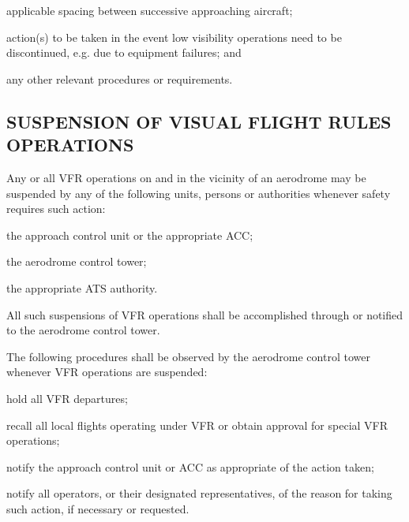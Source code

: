 \begin{enumerate}
\begin{enumalph}
        \item applicable spacing between successive approaching aircraft;
        \item action(s) to be taken in the event low visibility operations need to be discontinued, e.g. due to equipment failures; and
        \item any other relevant procedures or requirements.
    \end{enumalph}


\end{enumerate}

\subsection[Suspension of visual flight rules operations]{SUSPENSION OF VISUAL FLIGHT RULES OPERATIONS}

\begin{enumnoss}
    \item Any or all VFR operations on and in the vicinity of an aerodrome may be suspended by any of the following units, persons or authorities whenever safety requires such action:

    \begin{enumalph}
        \item the approach control unit or the appropriate ACC;
        \item the aerodrome control tower;
        \item the appropriate ATS authority.
    \end{enumalph}

    \item All such suspensions of VFR operations shall be accomplished through or notified to the aerodrome control tower.
    \item The following procedures shall be observed by the aerodrome control tower whenever VFR operations are suspended:

    \begin{enumalph}
        \item hold all VFR departures;
        \item recall all local flights operating under VFR or obtain approval for special VFR operations;
        \item notify the approach control unit or ACC as appropriate of the action taken;
        \item notify all operators, or their designated representatives, of the reason for taking such action, if necessary or requested.
    \end{enumalph}
\end{enumnoss}

